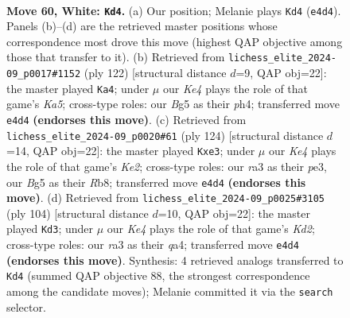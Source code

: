 \documentclass[11pt]{article}
\begin{document}
\clearpage

\begin{figure}[p]\centering
\begin{subfigure}{0.46\textwidth}\centering
\resizebox{\linewidth}{!}{%
\newchessgame
\chessboard[
  setfen={8/3k3r/3P4/1p4B1/4K3/r7/1p6/8 w - - 2 60},
  showmover=false,
  pgfstyle=straightmove, color=movearrow, markmove={e4-d4}
]}
\caption{}
\end{subfigure}\hfill
\begin{subfigure}{0.46\textwidth}\centering
\resizebox{\linewidth}{!}{%
\newchessgame
\chessboard[
  setfen={8/2r5/5rp1/K7/2k4p/2P4P/8/8 w - - 4 62},
  showmover=false,
  pgfstyle=straightmove, color=movearrow, markmove={a5-a4}
]}
\caption{}
\end{subfigure}
\\[4pt]
\begin{subfigure}{0.46\textwidth}\centering
\resizebox{\linewidth}{!}{%
\newchessgame
\chessboard[
  setfen={1R6/r5k1/6P1/8/8/4p3/4K3/8 w - - 0 63},
  showmover=false,
  pgfstyle=straightmove, color=movearrow, markmove={e2-e3}
]}
\caption{}
\end{subfigure}\hfill
\begin{subfigure}{0.46\textwidth}\centering
\resizebox{\linewidth}{!}{%
\newchessgame
\chessboard[
  setfen={8/2r4k/1p5P/8/q7/8/3K4/8 w - - 2 53},
  showmover=false,
  pgfstyle=straightmove, color=movearrow, markmove={d2-d3}
]}
\caption{}
\end{subfigure}
\caption{\textbf{Move 60, White: \texttt{Kd4}.} (a) Our position; Melanie plays \texttt{Kd4} (\texttt{e4d4}). Panels (b)--(d) are the retrieved master positions whose correspondence most drove this move (highest QAP objective among those that transfer to it). (b) Retrieved from \texttt{lichess\_elite\_2024-09\_p0017\#1152} (ply 122) [structural distance $d$=9, QAP obj=22]: the master played \texttt{Ka4}; under $\mu$ our \emph{Ke4} plays the role of that game's \emph{Ka5}; cross-type roles: our \emph{B}g5 as their \emph{p}h4; transferred move \texttt{e4d4} \textbf{(endorses this move)}. (c) Retrieved from \texttt{lichess\_elite\_2024-09\_p0020\#61} (ply 124) [structural distance $d$=14, QAP obj=22]: the master played \texttt{Kxe3}; under $\mu$ our \emph{Ke4} plays the role of that game's \emph{Ke2}; cross-type roles: our \emph{r}a3 as their \emph{p}e3, our \emph{B}g5 as their \emph{R}b8; transferred move \texttt{e4d4} \textbf{(endorses this move)}. (d) Retrieved from \texttt{lichess\_elite\_2024-09\_p0025\#3105} (ply 104) [structural distance $d$=10, QAP obj=22]: the master played \texttt{Kd3}; under $\mu$ our \emph{Ke4} plays the role of that game's \emph{Kd2}; cross-type roles: our \emph{r}a3 as their \emph{q}a4; transferred move \texttt{e4d4} \textbf{(endorses this move)}. Synthesis: 4 retrieved analogs transferred to \texttt{Kd4} (summed QAP objective 88, the strongest correspondence among the candidate moves); Melanie committed it via the \texttt{search} selector.}
\label{fig:thought-m118}
\end{figure}
\end{document}

